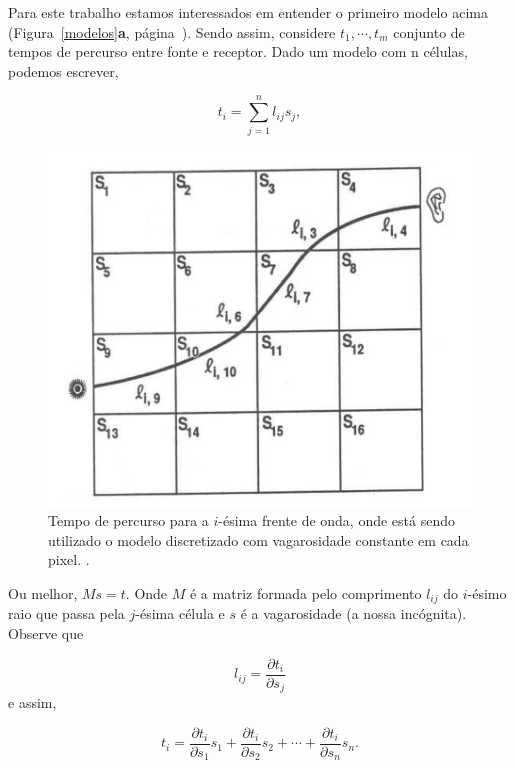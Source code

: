 \documentclass[a4paper, 12 pt]{article} %
\begin{document}
Para este trabalho estamos interessados em entender o primeiro modelo acima (Figura~\ref{modelos}\textbf{a}, página~\pageref{modelos}). Sendo assim, considere $t_{1}, \cdots, t_{m}$ conjunto de tempos de percurso entre fonte e receptor. Dado um modelo com n células, podemos escrever, 

\begin{equation}\label{eq:percurso}
t_{i} = \sum_{j=1}^{n} l_{ij}s_{j},
\end{equation}

\begin{figure}[!hbtp]
	\begin{center}
		\includegraphics[scale=0.60]{Figuras/tempo_percurso.png}
	\end{center}
	\caption{Tempo de percurso para a $i$-ésima frente de onda, onde está sendo utilizado o modelo discretizado com vagarosidade constante em cada pixel. \cite{tempopercurso}.}
	\label{modelos_percurso}
\end{figure} \newpage
Ou melhor,  $Ms = t$. Onde $M$ é a matriz formada pelo comprimento $l_{ij}$ do $i$-ésimo raio que passa pela $j$-ésima célula e $s$ é a vagarosidade (a nossa incógnita). Observe que

\begin{equation}\label{eq:percurso_comprimento}
l_{ij} = \frac{\partial t_{i}}{\partial s_{j}}
\end{equation}
e assim,

\begin{equation}\label{eq:percurso_comprimento2}
t_{i} = \frac{\partial t_{i}}{\partial s_{1}}s_{1} + \frac{\partial t_{i}}{\partial s_{2}}s_{2} + \cdots + \frac{\partial t_{i}}{\partial s_{n}}s_{n}.
\end{equation}
\\
\end{document}
